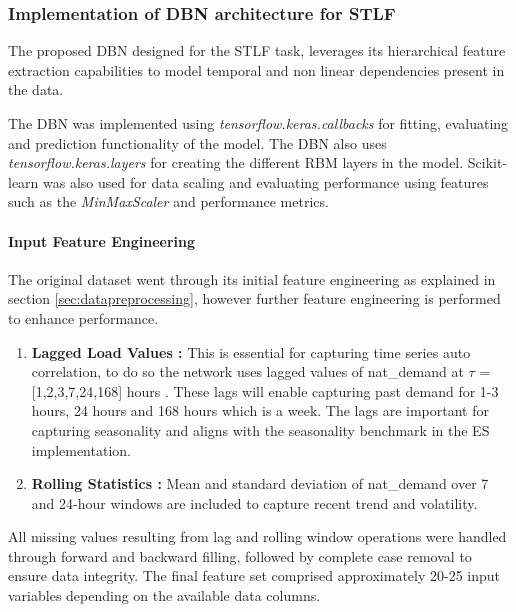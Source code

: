 \subsubsection{Implementation of DBN architecture for STLF}
The proposed DBN designed for the STLF task, leverages its hierarchical feature extraction capabilities to model temporal and non linear dependencies present in the data.

The DBN was implemented using \textit{tensorflow.keras.callbacks} for fitting, evaluating and prediction functionality of the model. The DBN also uses \textit{tensorflow.keras.layers} for creating the different RBM layers in the model. Scikit-learn was also used for data scaling and evaluating performance using features such as the \textit{MinMaxScaler} and performance metrics. \\ 

\paragraph{Input Feature Engineering}

The original dataset went through its initial feature engineering as explained in section \ref{sec:datapreprocessing}, however further feature engineering is performed to enhance performance.

\begin{enumerate}
	\item \textbf{Lagged Load Values : } This is essential for capturing time series auto correlation, to do so the network uses lagged values of nat\_demand at $\tau$ = [1,2,3,7,24,168] hours . These lags will enable capturing past demand for 1-3 hours, 24 hours and 168 hours which is a week. The lags are important for capturing seasonality and aligns with the seasonality benchmark in the ES implementation.

	\item \textbf{Rolling Statistics : } Mean and standard deviation of nat\_demand over 7 and 24-hour windows are included to capture recent trend and volatility.
\end{enumerate}
All missing values resulting from lag and rolling window operations were handled through forward and backward filling, followed by complete case removal to ensure data integrity. The final feature set comprised approximately 20-25 input variables depending on the available data columns.
